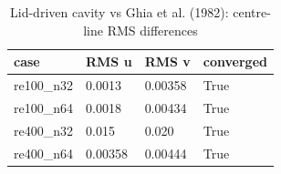 \begin{table}[t]\centering\small\caption{Lid-driven cavity vs Ghia et al. (1982): centre-line RMS differences}\label{tab:phase6_cavity}
\begin{tabular}{llll}\toprule
case & RMS u & RMS v & converged \\ \midrule
re100\_n32 & 0.0013 & 0.00358 & True \\
re100\_n64 & 0.0018 & 0.00434 & True \\
re400\_n32 & 0.015 & 0.020 & True \\
re400\_n64 & 0.00358 & 0.00444 & True \\
\bottomrule\end{tabular}\end{table}
